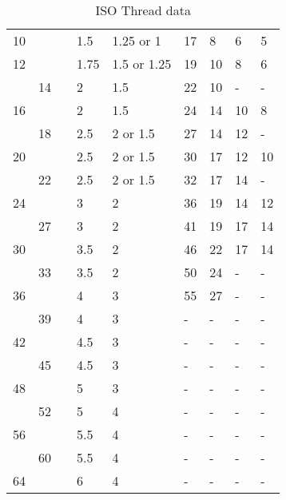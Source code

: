 \begin{table}[h!]
\begin{longtable}{lll|ll|llll}
    10  &    &    &1.5  &1.25 or 1  &17  &8      &6      &5 \\
    12  &    &    &1.75 &1.5 or 1.25&19  &10     &8      &6 \\
        &14  &    &2    &1.5        &22  &10     &-      &-    \\
    16  &    &    &2    &1.5        &24  &14     &10     &8 \\
        &18  &    &2.5  &2 or 1.5   &27  &14     &12     &-    \\
    20  &    &    &2.5  &2 or 1.5   &30  &17     &12     &10 \\
        &22  &    &2.5  &2 or 1.5   &32  &17     &14     &-    \\
    24  &    &    &3    &2          &36  &19     &14     &12 \\
        &27  &    &3    &2          &41  &19     &17     &14 \\
    30  &    &    &3.5  &2          &46  &22     &17     &14 \\
        &33  &    &3.5  &2          &50  &24     &-      &-    \\
    36  &    &    &4    &3          &55  &27     &-      &-    \\
        &39  &    &4    &3          &-   &-      &-      &-    \\
    42  &    &    &4.5  &3          &-   &-      &-      &-    \\
        &45  &    &4.5  &3          &-   &-      &-      &-    \\
    48  &    &    &5    &3          &-   &-      &-      &-    \\
        &52  &    &5    &4          &-   &-      &-      &-    \\
    56  &    &    &5.5  &4          &-   &-      &-      &-    \\
        &60  &    &5.5  &4          &-   &-      &-      &-    \\
    64  &    &    &6    &4          &-   &-      &-      &-    \\
\end{longtable}
\caption{ISO Thread data}
\end{table}







\clearpage
